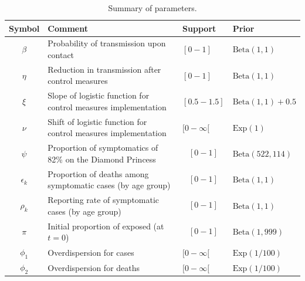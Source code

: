 \documentclass{article}
\begin{document}
	\begin{table}[h]
		\centering
		\begin{tabular}{cp{8cm}ll}
			\hline
			Symbol & Comment & Support & Prior \\
			\hline 
			$\beta$ & Probability of transmission upon contact & $[0-1]$ & $\text{Beta}(1,1)$  \\
			$\eta$ & Reduction in transmission after control measures & $[0-1]$ & $\text{Beta}(1,1)$ \\
			$\xi$ & Slope of logistic function for control measures implementation & $[0.5-1.5]$ & $ \text{Beta}(1,1) + 0.5$  \\
			$\nu$ & Shift of logistic function for control measures implementation & $[0-\infty[$ & $\text{Exp}(1)$  \\
			$\psi$ & Proportion of symptomatics of 82\% on the Diamond Princess \cite{diamond2} & $$[0-1]$$ & $\text{Beta}(522,114)$ \\
			$\epsilon_k$ & Proportion of deaths among symptomatic cases (by age group) & $$[0-1]$$ & $\text{Beta}(1,1)$  \\
			$\rho_k$ & Reporting rate of symptomatic cases (by age group) & $$[0-1]$$ & $\text{Beta}(1,1)$  \\
			$\pi$ & Initial proportion of exposed (at $t=0$) & $$[0-1]$$ & $\text{Beta}(1,999)$  \\
			$\phi_1$ & Overdispersion for cases & $[0-\infty[$ & $\text{Exp}(1/100)$  \\
			$\phi_2$ & Overdispersion for deaths & $[0-\infty[$ & $\text{Exp}(1/100)$  \\
			
			\hline 
		\end{tabular} 
		\caption{Summary of parameters.}\label{prior}
	\end{table}
	
\end{document}

